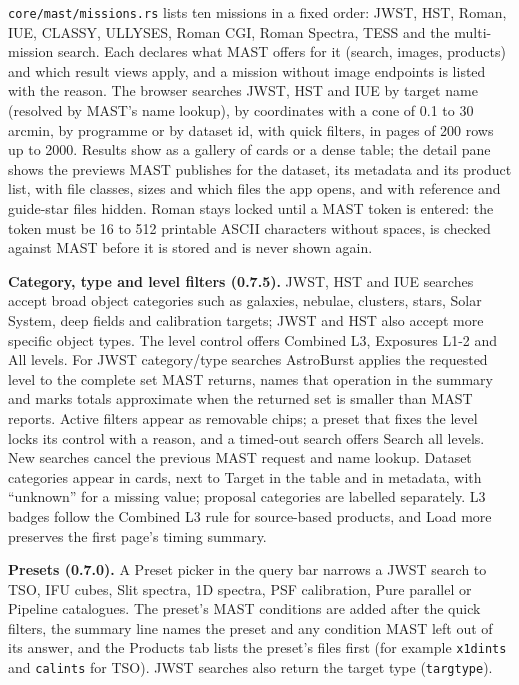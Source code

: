 \documentclass[11pt,a4paper]{article}
\newcommand{\code}[1]{\texttt{\small #1}}
\begin{document}
    \code{core/mast/missions.rs} lists ten missions in a fixed order: JWST, HST, Roman, IUE, CLASSY, ULLYSES, Roman CGI, Roman Spectra, TESS and the multi-mission search. Each declares what MAST offers for it (search, images, products) and which result views apply, and a mission without image endpoints is listed with the reason. The browser searches JWST, HST and IUE by target name (resolved by MAST's name lookup), by coordinates with a cone of 0.1 to 30\,arcmin, by programme or by dataset id, with quick filters, in pages of 200 rows up to 2000. Results show as a gallery of cards or a dense table; the detail pane shows the previews MAST publishes for the dataset, its metadata and its product list, with file classes, sizes and which files the app opens, and with reference and guide-star files hidden. Roman stays locked until a MAST token is entered: the token must be 16 to 512 printable ASCII characters without spaces, is checked against MAST before it is stored and is never shown again.

    \textbf{Category, type and level filters (0.7.5).} JWST, HST and IUE searches accept broad object categories such as galaxies, nebulae, clusters, stars, Solar System, deep fields and calibration targets; JWST and HST also accept more specific object types. The level control offers Combined L3, Exposures L1-2 and All levels. For JWST category/type searches AstroBurst applies the requested level to the complete set MAST returns, names that operation in the summary and marks totals approximate when the returned set is smaller than MAST reports. Active filters appear as removable chips; a preset that fixes the level locks its control with a reason, and a timed-out search offers Search all levels. New searches cancel the previous MAST request and name lookup. Dataset categories appear in cards, next to Target in the table and in metadata, with ``unknown'' for a missing value; proposal categories are labelled separately. L3 badges follow the Combined L3 rule for source-based products, and Load more preserves the first page's timing summary.

    \textbf{Presets (0.7.0).} A Preset picker in the query bar narrows a JWST search to TSO, IFU cubes, Slit spectra, 1D spectra, PSF calibration, Pure parallel or Pipeline catalogues. The preset's MAST conditions are added after the quick filters, the summary line names the preset and any condition MAST left out of its answer, and the Products tab lists the preset's files first (for example \code{x1dints} and \code{calints} for TSO). JWST searches also return the target type (\code{targtype}).
\end{document}
